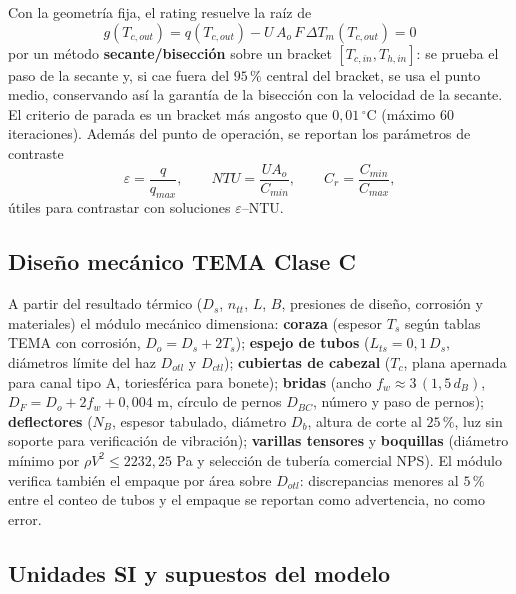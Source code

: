 \documentclass[11pt,a4paper]{article}
\begin{document}
Con la geometr\'ia fija, el rating resuelve la ra\'iz de
\begin{equation}
g(T_{c,out}) = q(T_{c,out}) - U \, A_o \, F \, \Delta T_m(T_{c,out}) = 0
\end{equation}
por un m\'etodo \textbf{secante/bisecci\'on} sobre un bracket $[T_{c,in},
T_{h,in}]$: se prueba el paso de la secante y, si cae fuera del $95\,\%$ central
del bracket, se usa el punto medio, conservando as\'i la garant\'ia de la
bisecci\'on con la velocidad de la secante. El criterio de parada es un bracket
m\'as angosto que $0{,}01\,^\circ$C (m\'aximo 60 iteraciones). Adem\'as del punto
de operaci\'on, se reportan los par\'ametros de contraste
\begin{equation}
\varepsilon = \frac{q}{q_{max}}, \qquad
NTU = \frac{U A_o}{C_{min}}, \qquad
C_r = \frac{C_{min}}{C_{max}},
\end{equation}
\'utiles para contrastar con soluciones $\varepsilon$--NTU.

\subsection{Dise\~no mec\'anico TEMA Clase C}

A partir del resultado t\'ermico ($D_s$, $n_{tt}$, $L$, $B$, presiones de
dise\~no, corrosi\'on y materiales) el m\'odulo mec\'anico dimensiona:
\textbf{coraza} (espesor $T_s$ seg\'un tablas TEMA con corrosi\'on, $D_o =
D_s + 2 T_s$); \textbf{espejo de tubos} ($L_{ts} = 0{,}1 \, D_s$, di\'ametros
l\'imite del haz $D_{otl}$ y $D_{ctl}$); \textbf{cubiertas de cabezal}
($T_c$, plana apernada para canal tipo A, toriesf\'erica para bonete);
\textbf{bridas} (ancho $f_w \approx 3\,(1{,}5\, d_B)$,
$D_F = D_o + 2 f_w + 0{,}004$ m, c\'irculo de pernos $D_{BC}$, n\'umero y paso
de pernos); \textbf{deflectores} ($N_B$, espesor tabulado, di\'ametro
$D_b$, altura de corte al $25\,\%$, luz sin soporte para verificaci\'on de
vibraci\'on); \textbf{varillas tensores} y \textbf{boquillas} (di\'ametro
m\'inimo por $\rho V^2 \le 2232{,}25$ Pa y selecci\'on de tuber\'ia comercial
NPS). El m\'odulo verifica tambi\'en el empaque por \'area sobre $D_{otl}$:
discrepancias menores al $5\,\%$ entre el conteo de tubos y el empaque se
reportan como advertencia, no como error.

\subsection{Unidades SI y supuestos del modelo}
\label{sec:supuestos}
\end{document}
